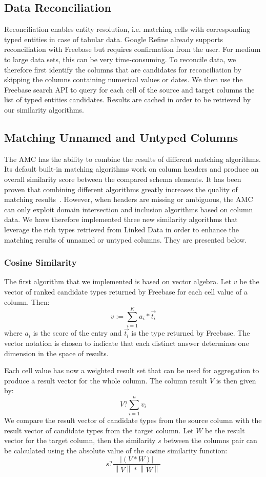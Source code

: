 \subsection{Data Reconciliation}
Reconciliation enables entity resolution, i.e. matching cells with corresponding typed entities in case of tabular data. Google Refine already supports reconciliation with Freebase but requires confirmation from the user. For medium to large data sets, this can be very time-consuming. To reconcile data, we therefore first identify the columns that are candidates for reconciliation by skipping the columns containing numerical values or dates. We then use the Freebase search API to query for each cell of the source and target columns the list of typed entities candidates. Results are cached in order to be retrieved by our similarity algorithms.


\subsection{Matching Unnamed and Untyped Columns}
The AMC has the ability to combine the results of different matching algorithms. Its default built-in matching algorithms work on column headers and produce an overall similarity score between the compared schema elements. It has been proven that combining different algorithms greatly increases the quality of matching results~\cite{Peukert:ICDE:12}\cite{conf/wise/StracciaT05}. However, when headers are missing or ambiguous, the AMC can only exploit domain intersection and inclusion algorithms based on column data. We have therefore implemented three new similarity algorithms that leverage the rich types retrieved from Linked Data in order to enhance the matching results of unnamed or untyped columns. They are presented below.


\subsubsection{Cosine Similarity}
The first algorithm that we implemented is based on vector algebra. Let $v$ be the vector of ranked candidate types returned by Freebase for each cell value of a column. Then:
\[v:=\sum^K_{i=1}{a_i}*\overrightarrow{t_i}\]
where $a_i$ is the score of the entry and $\overrightarrow{t_i}$ is the type returned by Freebase. The vector notation is chosen to indicate that each distinct answer determines one dimension in the space of results.

Each cell value has now a weighted result set that can be used for aggregation to produce a result vector for the whole column. The column result $V$ is then given by:
\[V?\sum^n_{i=1}{v_i}\]
We compare the result vector of candidate types from the source column with the result vector of candidate types from the target column. Let $W$ be the result vector for the target column, then the similarity $s$ between the columns pair can be calculated using the absolute value of the cosine similarity function:
\[s?\frac{\left|(V*W)\right|}{\left\|V\right\|*\left\|W\right\|}\]


